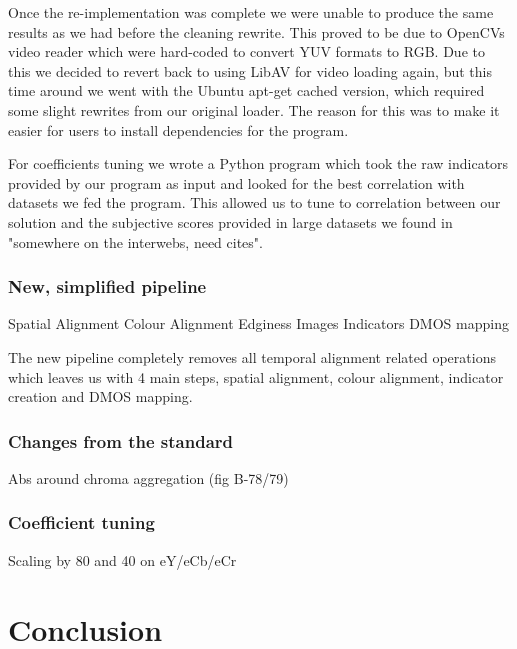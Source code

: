 Once the re-implementation was complete we were unable to produce the same results as we had before the cleaning rewrite. This proved to be due to OpenCVs video reader which were hard-coded to convert YUV formats to RGB. Due to this we decided to revert back to using LibAV for video loading again, but this time around we went with the Ubuntu apt-get cached version, which required some slight rewrites from our original loader. The reason for this was to make it easier for users to install dependencies for the program. 

For coefficients tuning we wrote a Python program which took the raw indicators provided by our program as input and looked for the best correlation with datasets we fed the program. This allowed us to tune to correlation between our solution and the subjective scores provided in large datasets we found in "somewhere on the interwebs, need cites". 

\section{New, simplified pipeline}
Spatial Alignment
Colour Alignment
Edginess Images
Indicators
DMOS mapping

The new pipeline completely removes all temporal alignment related operations which leaves us with 4 main steps, spatial alignment, colour alignment, indicator creation and DMOS mapping.


\section{Changes from the standard}
Abs around chroma aggregation (fig B-78/79)

\section{Coefficient tuning}
Scaling by 80 and 40 on eY/eCb/eCr





\part{Conclusion}  
                  

